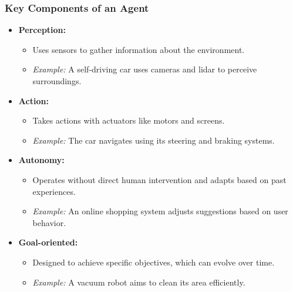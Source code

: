 \documentclass[aspectratio=169]{beamer}
\begin{document}
\begin{frame}[fragile]
    \frametitle{Key Components of an Agent}
    \begin{itemize}
        \item \textbf{Perception:}
        \begin{itemize}
            \item Uses sensors to gather information about the environment.
            \item \textit{Example:} A self-driving car uses cameras and lidar to perceive surroundings.
        \end{itemize}
        
        \item \textbf{Action:}
        \begin{itemize}
            \item Takes actions with actuators like motors and screens.
            \item \textit{Example:} The car navigates using its steering and braking systems.
        \end{itemize}
        
        \item \textbf{Autonomy:}
        \begin{itemize}
            \item Operates without direct human intervention and adapts based on past experiences.
            \item \textit{Example:} An online shopping system adjusts suggestions based on user behavior.
        \end{itemize}
        
        \item \textbf{Goal-oriented:}
        \begin{itemize}
            \item Designed to achieve specific objectives, which can evolve over time.
            \item \textit{Example:} A vacuum robot aims to clean its area efficiently.
        \end{itemize}
    \end{itemize}
\end{frame}
\end{document}

